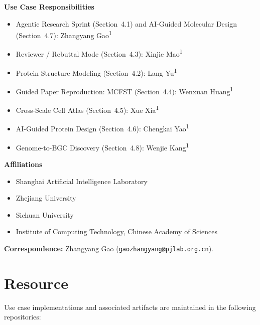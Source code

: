 \documentclass[sn-basic,Numbered,pdflatex]{sn-jnl}
\begin{document}
\begin{appendices}
\medskip
\noindent\textbf{Use Case Responsibilities}
\begin{itemize}
  \item Agentic Research Sprint (Section~4.1) and AI-Guided Molecular Design (Section~4.7): Zhangyang Gao\textsuperscript{1}
  \item Reviewer / Rebuttal Mode (Section~4.3): Xinjie Mao\textsuperscript{1}
  \item Protein Structure Modeling (Section~4.2): Lang Yu\textsuperscript{1}
  \item Guided Paper Reproduction: MCFST (Section~4.4): Wenxuan Huang\textsuperscript{1}
  \item Cross-Scale Cell Atlas (Section~4.5): Xue Xia\textsuperscript{1}
  \item AI-Guided Protein Design (Section~4.6): Chengkai Yao\textsuperscript{1}
  \item Genome-to-BGC Discovery (Section~4.8): Wenjie Kang\textsuperscript{1}
\end{itemize}

\noindent\textbf{Affiliations}
\begin{itemize}
  \item[\textsuperscript{1}] Shanghai Artificial Intelligence Laboratory
  \item[\textsuperscript{2}] Zhejiang University
  \item[\textsuperscript{3}] Sichuan University
  \item[\textsuperscript{4}] Institute of Computing Technology, Chinese Academy of Sciences
\end{itemize}

\noindent\textbf{Correspondence:} Zhangyang Gao (\texttt{gaozhangyang@pjlab.org.cn}).
\endgroup

\end{appendices}
\clearpage

\section*{Resource}

\noindent Use case implementations and associated artifacts are maintained in the following repositories:
\end{document}
